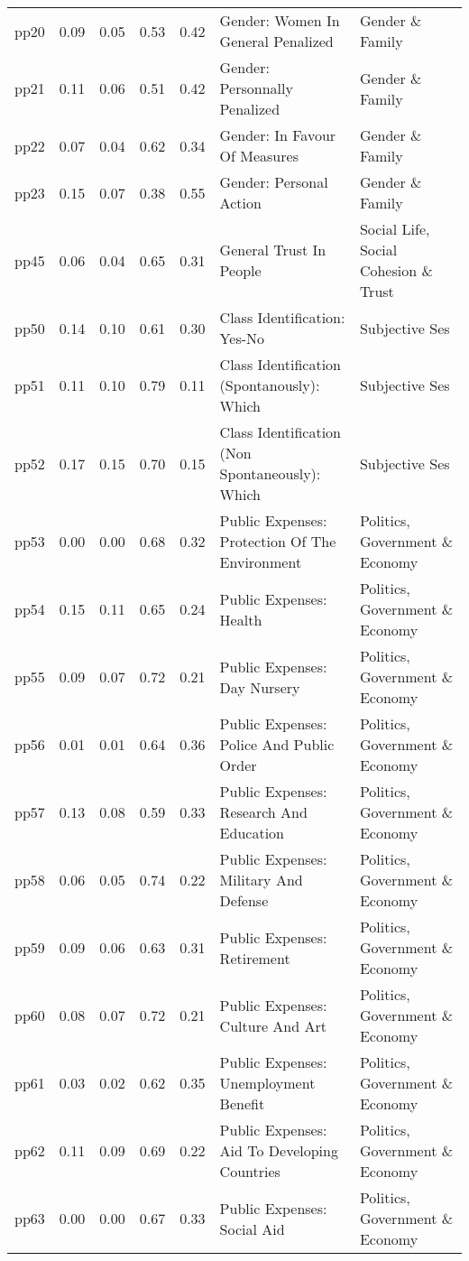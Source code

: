 \begin{longtable}{l|rrrrll}
pp20 & 0.09 & 0.05 & 0.53 & 0.42 & Gender: Women In General Penalized & Gender \& Family \\ 
pp21 & 0.11 & 0.06 & 0.51 & 0.42 & Gender: Personnally Penalized & Gender \& Family \\ 
pp22 & 0.07 & 0.04 & 0.62 & 0.34 & Gender: In Favour Of Measures & Gender \& Family \\ 
pp23 & 0.15 & 0.07 & 0.38 & 0.55 & Gender: Personal Action & Gender \& Family \\ 
pp45 & 0.06 & 0.04 & 0.65 & 0.31 & General Trust In People & Social Life, Social Cohesion \& Trust \\ 
pp50 & 0.14 & 0.10 & 0.61 & 0.30 & Class Identification: Yes-No & Subjective Ses \\ 
pp51 & 0.11 & 0.10 & 0.79 & 0.11 & Class Identification (Spontanously): Which & Subjective Ses \\ 
pp52 & 0.17 & 0.15 & 0.70 & 0.15 & Class Identification (Non Spontaneously): Which & Subjective Ses \\ 
pp53 & 0.00 & 0.00 & 0.68 & 0.32 & Public Expenses: Protection Of The Environment & Politics, Government \& Economy \\ 
pp54 & 0.15 & 0.11 & 0.65 & 0.24 & Public Expenses: Health & Politics, Government \& Economy \\ 
pp55 & 0.09 & 0.07 & 0.72 & 0.21 & Public Expenses: Day Nursery & Politics, Government \& Economy \\ 
pp56 & 0.01 & 0.01 & 0.64 & 0.36 & Public Expenses: Police And Public Order & Politics, Government \& Economy \\ 
pp57 & 0.13 & 0.08 & 0.59 & 0.33 & Public Expenses: Research And Education & Politics, Government \& Economy \\ 
pp58 & 0.06 & 0.05 & 0.74 & 0.22 & Public Expenses: Military And Defense & Politics, Government \& Economy \\ 
pp59 & 0.09 & 0.06 & 0.63 & 0.31 & Public Expenses: Retirement & Politics, Government \& Economy \\ 
pp60 & 0.08 & 0.07 & 0.72 & 0.21 & Public Expenses: Culture And Art & Politics, Government \& Economy \\ 
pp61 & 0.03 & 0.02 & 0.62 & 0.35 & Public Expenses: Unemployment Benefit & Politics, Government \& Economy \\ 
pp62 & 0.11 & 0.09 & 0.69 & 0.22 & Public Expenses: Aid To Developing Countries & Politics, Government \& Economy \\ 
pp63 & 0.00 & 0.00 & 0.67 & 0.33 & Public Expenses: Social Aid & Politics, Government \& Economy \\ 

\end{longtable}
